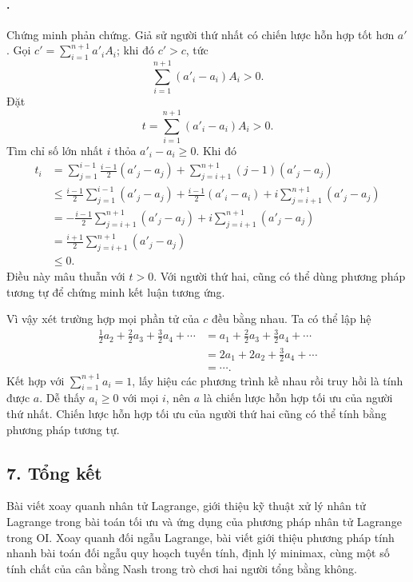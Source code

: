 \documentclass[11pt]{article}
\begin{document}
\paragraph{.}
Chứng minh phản chứng. Giả sử người thứ nhất có chiến lược hỗn hợp tốt hơn
\(a'\). Gọi \(c'=\sum_{i=1}^{n+1}a'_iA_i\); khi đó \(c'>c\), tức
\[
  \sum_{i=1}^{n+1}(a'_i-a_i)A_i>0.
\]
Đặt
\[
  t=\sum_{i=1}^{n+1}(a'_i-a_i)A_i>0.
\]
Tìm chỉ số lớn nhất \(i\) thỏa \(a'_i-a_i\ge 0\). Khi đó
\[
\begin{aligned}
  t_i
  &=\sum_{j=1}^{i-1}\frac{i-1}{2}(a'_j-a_j)
    +\sum_{j=i+1}^{n+1}(j-1)(a'_j-a_j)\\
  &\le \frac{i-1}{2}\sum_{j=1}^{i-1}(a'_j-a_j)
    +\frac{i-1}{2}(a'_i-a_i)
    +i\sum_{j=i+1}^{n+1}(a'_j-a_j)\\
  &=-\frac{i-1}{2}\sum_{j=i+1}^{n+1}(a'_j-a_j)
    +i\sum_{j=i+1}^{n+1}(a'_j-a_j)\\
  &=\frac{i+1}{2}\sum_{j=i+1}^{n+1}(a'_j-a_j)\\
  &\le 0.
\end{aligned}
\]
Điều này mâu thuẫn với \(t>0\). Với người thứ hai, cũng có thể dùng phương pháp
tương tự để chứng minh kết luận tương ứng.

Vì vậy xét trường hợp mọi phần tử của \(c\) đều bằng nhau. Ta có thể lập hệ
\[
\begin{aligned}
  \frac{1}{2}a_2+\frac{2}{2}a_3+\frac{3}{2}a_4+\cdots
  &=
  a_1+\frac{2}{2}a_3+\frac{3}{2}a_4+\cdots\\
  &=
  2a_1+2a_2+\frac{3}{2}a_4+\cdots\\
  &=\cdots .
\end{aligned}
\]
Kết hợp với \(\sum_{i=1}^{n+1}a_i=1\), lấy hiệu các phương trình kề nhau rồi
truy hồi là tính được \(a\). Dễ thấy \(a_i\ge 0\) với mọi \(i\), nên \(a\) là
chiến lược hỗn hợp tối ưu của người thứ nhất. Chiến lược hỗn hợp tối ưu của
người thứ hai cũng có thể tính bằng phương pháp tương tự.

\subsection*{7. Tổng kết}

Bài viết xoay quanh nhân tử Lagrange, giới thiệu kỹ thuật xử lý nhân tử
Lagrange trong bài toán tối ưu và ứng dụng của phương pháp nhân tử Lagrange
trong OI. Xoay quanh đối ngẫu Lagrange, bài viết giới thiệu phương pháp tính
nhanh bài toán đối ngẫu quy hoạch tuyến tính, định lý minimax, cùng một số tính
chất của cân bằng Nash trong trò chơi hai người tổng bằng không.
\end{document}
